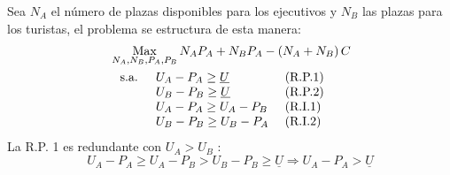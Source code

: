 Sea $N_{A}$ el número de plazas disponibles para los ejecutivos y $N_{B}$ las plazas para los turistas, el problema se estructura de esta manera:
\begin{align*}
	& \operatorname*{Max} \limits_{N_A,N_B,P_A,P_B} N_AP_A+N_BP_A - \left( N_A + N_B\right) C\\
	& \begin{array}{lll}
		\text{ s.a. } & U_{A}-P_{A} \geq \underline{U} & \text { (R.P.1) } \\
		& U_{B}-P_{B} \geq \underline{U} & \text { (R.P.2) } \\
		& U_{A}-P_{A} \geq U_{A}-P_{B}   & \text { (R.I.1) } \\
		& U_{B}-P_{B} \geq U_{B}-P_{A}   & \text { (R.I.2) }
	\end{array}
\end{align*}
La R.P. 1 es redundante con $U_{A}>U_{B}$ :
$$ U_{A}-P_{A} \geq U_{A}-P_{B}>U_{B}-P_{B} \geq \underline{U} \Rightarrow U_{A}-P_{A}>\underline{U} $$